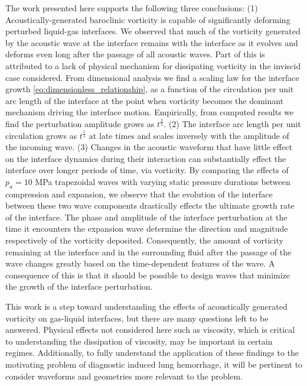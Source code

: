 \documentclass{jfm}%
\begin{document}
The work presented here supports the following three conclusions: (1)
Acoustically-generated baroclinic vorticity is capable of
significantly deforming perturbed liquid-gas interfaces. We observed
that much of the vorticity generated by the acoustic wave at the
interface remains with the interface as it evolves and deforms even
long after the passage of all acoustic waves. Part of this is
attributed to a lack of physical mechanism for dissipating vorticity
in the inviscid case considered. From dimensional analysis we find a
scaling law for the interface growth
\eqref{eq:dimensionless_relationship}, as a function of the
circulation per unit arc length of the interface at the point when
vorticity becomes the dominant mechanism driving the interface
motion. Empirically, from computed results we find the perturbation
amplitude grows as $t^{\frac{3}{5}}$. (2) The interface arc length
per unit circulation grows as $t^{\frac{1}{2}}$ at late times and
scales inversely with the amplitude of the incoming wave.
% 
(3) Changes in the acoustic waveform that have little effect on the
interface dynamics during their interaction can substantially effect
the interface over longer periods of time, via vorticity. By comparing
the effects of $p_a = 10$ MPa trapezoidal waves with varying static pressure
durations between compression and expansion, we observe that the
evolution of the interface between these two wave components
drastically effects the ultimate growth rate of the interface. The
phase and amplitude of the interface perturbation at the time it
encounters the expansion wave determine the direction and magnitude
respectively of the vorticity deposited. Consequently, the amount of
vorticity remaining at the interface and in the surrounding fluid
after the passage of the wave changes greatly based on the
time-dependent features of the wave. A consequence of this is that it
should be possible to design waves that minimize the growth of the
interface perturbation.

This work is a step toward understanding the effects of acoustically
generated vorticity on gas-liquid interfaces, but there are many
questions left to be answered. Physical effects not considered here
such as viscosity, which is critical to understanding the dissipation
of viscosity, may be important in certain regimes. Additionally, to
fully understand the application of these findings to the motivating
problem of diagnostic induced lung hemorrhage, it will be pertinent to
consider waveforms and geometries more relevant to the problem.
\end{document}
